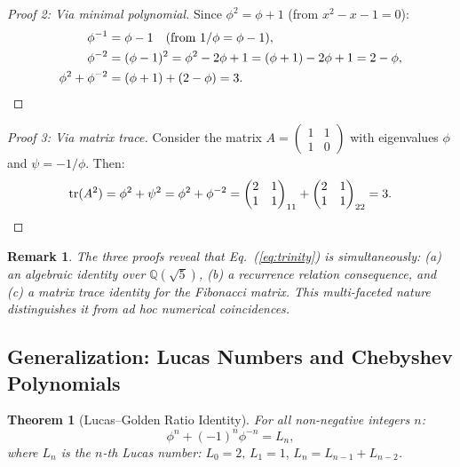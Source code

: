 \documentclass[aps,prd,preprint,superscriptaddress,showpacs,nofootinbib,longbibliography]{revtex4-2}
\newtheorem{theorem}{Theorem}
\newtheorem{remark}{Remark}
\begin{document}
\begin{proof}[Proof 2: Via minimal polynomial]
Since $\phi^2 = \phi + 1$ (from $x^2 - x - 1 = 0$):
\begin{align}
\phi^{-1} &= \phi - 1 \quad (\text{from } 1/\phi = \phi - 1), \\
\phi^{-2} &= (\phi-1)^2 = \phi^2 - 2\phi + 1 = (\phi+1) - 2\phi + 1 = 2 - \phi, \\
\phi^2 + \phi^{-2} &= (\phi + 1) + (2 - \phi) = 3. \qedhere
\end{align}
\end{proof}

\begin{proof}[Proof 3: Via matrix trace]
Consider the matrix $A = \begin{pmatrix} 1 & 1 \\ 1 & 0 \end{pmatrix}$ with eigenvalues $\phi$ and $\psi = -1/\phi$. Then:
\begin{equation}
\text{tr}(A^2) = \phi^2 + \psi^2 = \phi^2 + \phi^{-2} = \begin{pmatrix} 2 & 1 \\ 1 & 1 \end{pmatrix}_{11} + \begin{pmatrix} 2 & 1 \\ 1 & 1 \end{pmatrix}_{22} = 3. \qedhere
\end{equation}
\end{proof}

\begin{remark}
The three proofs reveal that Eq.~(\ref{eq:trinity}) is simultaneously: (a) an algebraic identity over $\mathbb{Q}(\sqrt{5})$, (b) a recurrence relation consequence, and (c) a matrix trace identity for the Fibonacci matrix. This multi-faceted nature distinguishes it from ad hoc numerical coincidences.
\end{remark}

\subsection{Generalization: Lucas Numbers and Chebyshev Polynomials}
\label{sec:lucas}

\begin{theorem}[Lucas--Golden Ratio Identity]
\label{thm:lucas}
For all non-negative integers $n$:
\begin{equation}
\label{eq:lucas}
\phi^n + (-1)^n \phi^{-n} = L_n,
\end{equation}
where $L_n$ is the $n$-th Lucas number: $L_0 = 2,\, L_1 = 1,\, L_n = L_{n-1} + L_{n-2}$.
\end{theorem}
\end{document}
